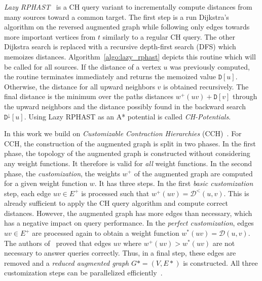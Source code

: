 \documentclass[a4paper,UKenglish,cleveref, autoref, thm-restate,anonymous]{lipics-v2021}
\newcommand*{\dist}{\mathcal{D}}
\newcommand*{\gchu}{G^{\uparrow}}
\begin{document}
\emph{Lazy RPHAST}~\cite{strasser_et_al:LIPIcs.SEA.2021.6} is a CH query variant to incrementally compute distances from many sources toward a common target.
The first step is a run Dijkstra's algorithm on the reversed augmented graph while following only edges towards more important vertices from $t$ similarly to a regular CH query.
The other Dijkstra search is replaced with a recursive depth-first search (DFS) which memoizes distances.
Algorithm~\ref{algo:lazy_rphast} depicts this routine which will be called for all sources.
If the distance of a vertex $u$ was previously computed, the routine terminates immediately and returns the memoized value $\mathtt{D}[u]$.
Otherwise, the distance for all upward neighbors $v$ is obtained recursively.
The final distance is the minimum over the paths distances $w^+(uv) + \mathtt{D}[v]$ through the upward neighbors and the distance possibly found in the backward search $\mathtt{D}^{\downarrow}[u]$.
Using Lazy RPHAST as an A* potential is called \emph{CH-Potentials}.

In this work we build on \emph{Customizable Contraction Hierarchies} (CCH)~\cite{dsw-cch-15}.
For CCH, the construction of the augmented graph is split in two phases.
In the first phase, the topology of the augmented graph is constructed without considering any weight functions.
It therefore is valid for \emph{all} weight functions.
In the second phase, the \emph{customization}, the weights $w^+$ of the augmented graph are computed for a given weight function $w$.
It has three steps.
In the first \emph{basic customization} step, each edge $uv \in E^+$ is processed such that $w^+(uv) = \dist^<(u,v)$.
This is already sufficient to apply the CH query algorithm and compute correct distances.
However, the augmented graph has more edges than necessary, which has a negative impact on query performance.
In the \emph{perfect customization}, edges $uv \in E^+$ are processed again to obtain a weight function $w^*(uv) = \dist(u,v)$.
The authors of~\cite{dsw-cch-15} proved that edges $uv$ where $w^+(uv) > w^*(uv)$ are not necessary to answer queries correctly.
Thus, in a final step, these edges are removed and a \emph{reduced augmented graph} $G*=(V, E*)$ is constructed.
All three customization steps can be parallelized efficiently~\cite{bsw-rttau-19}.
\end{document}
